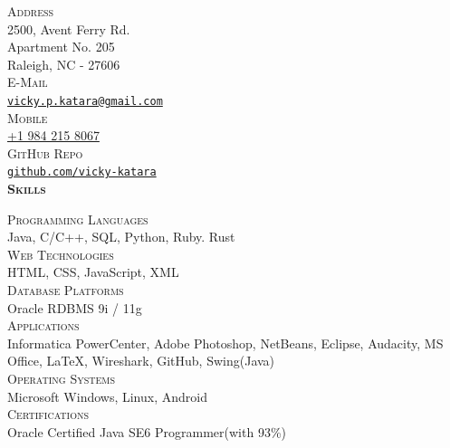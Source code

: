 \documentclass[letterpaper,12pt,final]{memoir}
\newcommand{\Sep}{\vspace{1.5em}}
\newcommand{\SmallSep}{\vspace{0.5em}}
\newcommand{\CVSection}[1]
	{\Large\textbf{\textsc{{#1}}}\par
	\SmallSep\normalsize\normalfont}
\newcommand{\CVItemSC}[1]
{{\textsc{\color{Black} #1}}}
\begin{document}

\begin{flushright} 
	\footnotesize
	\SmallSep
	\CVItemSC{Address}\\%
	
	2500, Avent Ferry Rd.\\
	Apartment No. 205\\
	Raleigh, NC - 27606\\
	\Sep
	\CVItemSC{E-Mail}\\%
	\href{mailto:vicky.p.katara@gmail.com}{\texttt{vicky.p.katara@gmail.com}}\\
	\Sep
	\CVItemSC{Mobile}\\%
	\href{tel:+19842158067}{+1 984 215 8067}\\
	\SmallSep
	\Sep
	\CVItemSC{GitHub Repo}\\%
	\href{https://github.com/vicky-katara}{\texttt{github.com/vicky-katara}}\\
	\SmallSep
\SmallSep
\CVSection{Skills}
\CVItemSC{Programming Languages}\\
{\footnotesize Java, C/C++, SQL, Python, Ruby. Rust}
\SmallSep\\
\CVItemSC{Web Technologies}\\
{\footnotesize HTML, CSS, JavaScript, XML}
\SmallSep\\
\CVItemSC{Database Platforms}\\
{\footnotesize Oracle RDBMS 9i / 11g}
\SmallSep\\
\CVItemSC{Applications}\\
{\footnotesize Informatica PowerCenter, Adobe Photoshop, NetBeans, Eclipse, Audacity, MS Office,  \LaTeX, Wireshark, GitHub, Swing(Java)}
\SmallSep\\
\CVItemSC{Operating Systems}\\
{\footnotesize Microsoft Windows, Linux, Android}
\SmallSep\\
\CVItemSC{Certifications}\\
{\footnotesize Oracle Certified Java SE6 Programmer\space(\space with 93\%)}
\end{flushright}\normalsize
\end{document}
